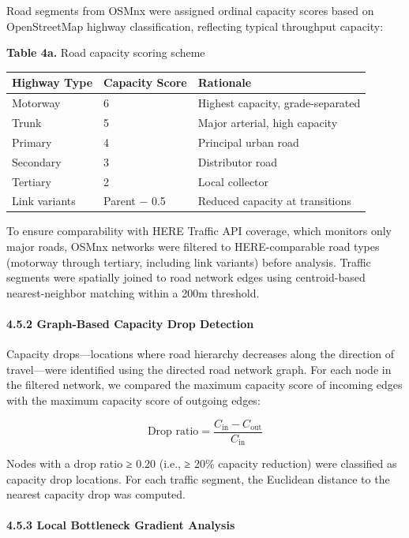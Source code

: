 \documentclass[
  12pt,
]{article}
\begin{document}
Road segments from OSMnx were assigned ordinal capacity scores based on OpenStreetMap highway classification, reflecting typical throughput capacity:

\textbf{Table 4a.} Road capacity scoring scheme

\begin{longtable}[]{@{}lll@{}}
\toprule\noalign{}
Highway Type & Capacity Score & Rationale \\
\midrule\noalign{}
\endhead
\bottomrule\noalign{}
\endlastfoot
Motorway & 6 & Highest capacity, grade-separated \\
Trunk & 5 & Major arterial, high capacity \\
Primary & 4 & Principal urban road \\
Secondary & 3 & Distributor road \\
Tertiary & 2 & Local collector \\
Link variants & Parent − 0.5 & Reduced capacity at transitions \\
\end{longtable}

To ensure comparability with HERE Traffic API coverage, which monitors only major roads, OSMnx networks were filtered to HERE-comparable road types (motorway through tertiary, including link variants) before analysis. Traffic segments were spatially joined to road network edges using centroid-based nearest-neighbor matching within a 200m threshold.

\paragraph{4.5.2 Graph-Based Capacity Drop Detection}\label{graph-based-capacity-drop-detection}

Capacity drops---locations where road hierarchy decreases along the direction of travel---were identified using the directed road network graph. For each node in the filtered network, we compared the maximum capacity score of incoming edges with the maximum capacity score of outgoing edges:

\[\text{Drop ratio} = \frac{C_{\text{in}} - C_{\text{out}}}{C_{\text{in}}}\]

Nodes with a drop ratio ≥ 0.20 (i.e., ≥ 20\% capacity reduction) were classified as capacity drop locations. For each traffic segment, the Euclidean distance to the nearest capacity drop was computed.

\paragraph{4.5.3 Local Bottleneck Gradient Analysis}\label{local-bottleneck-gradient-analysis}
\end{document}
